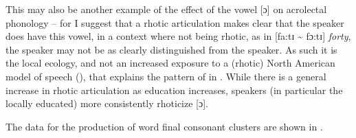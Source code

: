   This may also be another example of the effect of the  vowel [ɔ] on acrolectal phonology – for I suggest that a rhotic articulation makes clear that the speaker does have this vowel, in a context where not being rhotic, as in [fa:tɪ {\textasciitilde} fɔ:tɪ] \textit{forty}, the speaker may not be as clearly distinguished from the  speaker.  As such it is the local ecology, and not an increased exposure to a (rhotic) North American model of speech (\citealt[67]{Irvine1994}), that explains the pattern of  in .  While there is a general increase in rhotic articulation as education increases, speakers (in particular the locally educated) more consistently rhoticize [ɔ].     

  The data for the production of word final consonant clusters are shown in .


\begin{table}
\caption{Phonological clusters by educational attainment\label{tab:3.16}}
\end{table}


